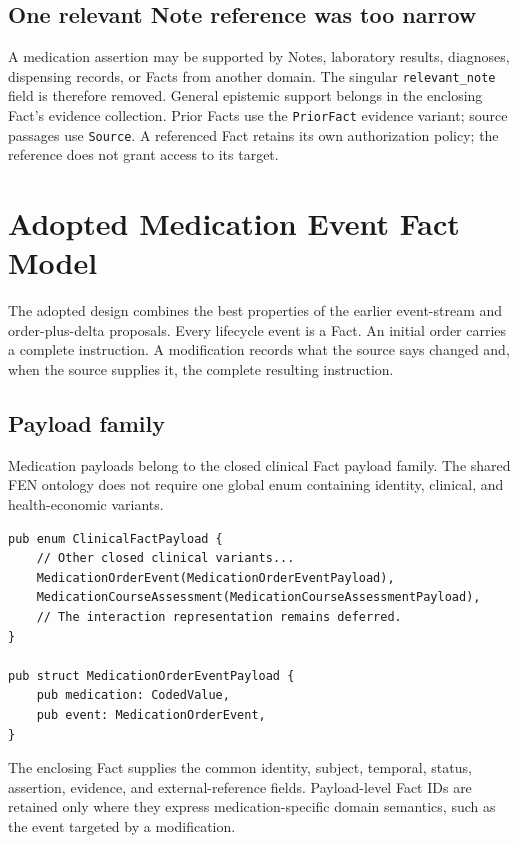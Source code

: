 \documentclass[11pt]{article}
\newcommand{\field}[1]{\texttt{#1}}
\begin{document}
\subsection{One relevant Note reference was too narrow}

A medication assertion may be supported by Notes, laboratory results,
diagnoses, dispensing records, or Facts from another domain. The singular
\field{relevant\_note} field is therefore removed. General epistemic support
belongs in the enclosing Fact's evidence collection. Prior Facts use the
\field{PriorFact} evidence variant; source passages use \field{Source}. A
referenced Fact retains its own authorization policy; the reference does not
grant access to its target.

\section{Adopted Medication Event Fact Model}
\label{sec:adopted-model}

The adopted design combines the best properties of the earlier event-stream
and order-plus-delta proposals. Every lifecycle event is a Fact. An initial
order carries a complete instruction. A modification records what the source
says changed and, when the source supplies it, the complete resulting
instruction.

\subsection{Payload family}

Medication payloads belong to the closed clinical Fact payload family. The
shared FEN ontology does not require one global enum containing identity,
clinical, and health-economic variants.

\begin{lstlisting}
pub enum ClinicalFactPayload {
    // Other closed clinical variants...
    MedicationOrderEvent(MedicationOrderEventPayload),
    MedicationCourseAssessment(MedicationCourseAssessmentPayload),
    // The interaction representation remains deferred.
}

pub struct MedicationOrderEventPayload {
    pub medication: CodedValue,
    pub event: MedicationOrderEvent,
}
\end{lstlisting}

The enclosing Fact supplies the common identity, subject, temporal, status,
assertion, evidence, and external-reference fields. Payload-level Fact IDs are
retained only where they express medication-specific domain semantics, such as
the event targeted by a modification.
\end{document}
